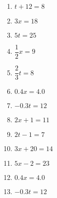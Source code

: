 \documentclass[12pt]{article}
\begin{document}
\begin{enumerate}
\begin{multicols}{2}
\begin{enumerate}
	\item \hspace{0.50in} $t+12=8$
	\spacing

	\item \hspace{0.50in} $3x=18$
	\spacing

	\item \hspace{0.50in} $5t=25$
	\spacing

	\item \hspace{0.50in} $\dfrac{1}{2}x=9$
	\spacing

	\item \hspace{0.50in} $\dfrac{2}{3}t=8$
	\spacing

	\item \hspace{0.50in} $0.4x=4.0$
	\spacing

	\item \hspace{0.50in} $-0.3t=12$
	\spacing

	\item \hspace{0.50in} $2x+1=11$
	\spacing

	\item \hspace{0.50in} $2t-1=7$
	\spacing

	\item \hspace{0.50in} $3x+20=14$
	\spacing

	\item \hspace{0.50in} $5x-2=23$
	\spacing

	\item \hspace{0.50in} $0.4x=4.0$
	\spacing

	\item \hspace{0.50in} $-0.3t=12$
	\spacing

	\end{enumerate}
	\end{multicols}
	\spacing

\end{enumerate}
\end{document}
